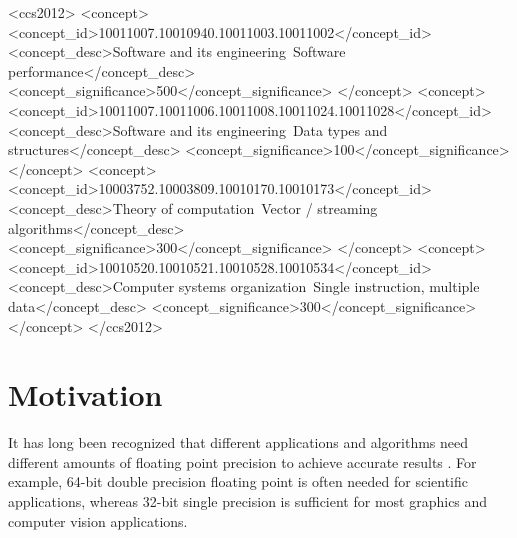 \documentclass{sig-alternate-05-2015}
\begin{document}
\begin{CCSXML}
<ccs2012>
<concept>
<concept_id>10011007.10010940.10011003.10011002</concept_id>
<concept_desc>Software and its engineering~Software performance</concept_desc>
<concept_significance>500</concept_significance>
</concept>
<concept>
<concept_id>10011007.10011006.10011008.10011024.10011028</concept_id>
<concept_desc>Software and its engineering~Data types and structures</concept_desc>
<concept_significance>100</concept_significance>
</concept>
<concept>
<concept_id>10003752.10003809.10010170.10010173</concept_id>
<concept_desc>Theory of computation~Vector / streaming algorithms</concept_desc>
<concept_significance>300</concept_significance>
</concept>
<concept>
<concept_id>10010520.10010521.10010528.10010534</concept_id>
<concept_desc>Computer systems organization~Single instruction, multiple data</concept_desc>
<concept_significance>300</concept_significance>
</concept>
</ccs2012>

\end{CCSXML}


\printccsdesc






















\section{Motivation}\label{sec:motivation}

It has long been recognized that different applications and algorithms need
different amounts of floating point precision to achieve accurate results
\cite{tong2000reducing,buttari2006exploiting,rubio2013precimonious}. For
example, 64-bit double precision floating point is often needed for scientific
applications, whereas 32-bit single precision is sufficient for most graphics
and computer vision applications.
\end{document}

